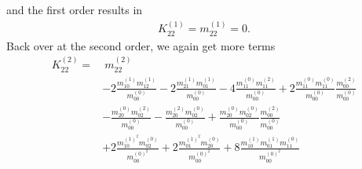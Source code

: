 and the first order results in
\begin{equation}
  \begin{aligned}
    K_{22}^{(1)} = m_{22}^{(1)} =  0.
  \end{aligned}
\end{equation}
Back over at the second order, we again get more terms
\begin{equation}
  \begin{aligned}
    K_{22}^{(2)}
    = &\
    m_{22}^{(2)}
    \\&
    - 2 \frac{ m_{10}^{(1)} m_{12}^{(1)} }{m_{00}^{(0)}}
    - 2 \frac{ m_{21}^{(1)} m_{01}^{(1)} }{m_{00}^{(0)}}
    - 4 \frac{ m_{11}^{(0)} m_{11}^{(2)} }{m_{00}^{(0)}}
    + 2 \frac{ m_{11}^{(0)} m_{11}^{(0)} }{m_{00}^{(0)}}\frac{ m_{00}^{(2)} }{m_{00}^{(0)}}
    \\&
    - \frac{ m_{20}^{(0)} m_{02}^{(2)} }{m_{00}^{(0)}}
    - \frac{ m_{20}^{(2)} m_{02}^{(0)} }{m_{00}^{(0)}}
    + \frac{ m_{20}^{(0)} m_{02}^{(0)} }{m_{00}^{(0)}}\frac{ m_{00}^{(2)} }{m_{00}^{(0)}}
    \\&
    + 2 \frac{ m_{10}^{{(1)}^2} m_{02}^{(0)} }{m_{00}^{{(0)}^2}}
    + 2 \frac{ m_{01}^{{(1)}^2} m_{20}^{(0)} }{m_{00}^{{(0)}^2}}
    + 8 \frac{ m_{10}^{(1)}m_{01}^{(1)} m_{11}^{(0)} }{m_{00}^{{(0)}^2}}
  \end{aligned}
\end{equation}

